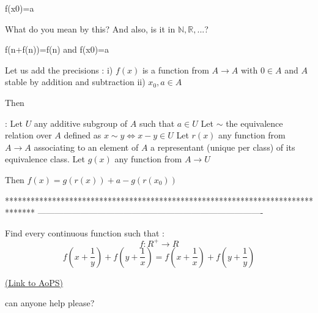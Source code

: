 \begin{solution}
	\begin{tcolorbox}f(x0)=a\end{tcolorbox}
What do you mean by this?
And also, is it in \(\mathbb{N}, \mathbb{R}, ...\)?
\end{solution}



\begin{solution}
	\begin{tcolorbox}f(n+f(n))=f(n) and f(x0)=a\end{tcolorbox}
Let us add the precisions :
i) $f(x)$ is a function from $A\to A$ with $0\in A$ and $A$ stable by addition and subtraction
ii) $x_0,a\in A$

Then  :
Let $U$ any additive subgroup of $A$ such that $a\in U$
Let $\sim$ the equivalence relation over $A$ defined as $x\sim y\iff x-y\in U$
Let $r(x)$ any function from $A\to A$ associating to an element of $A$ a representant (unique per class) of its equivalence class.
Let $g(x)$ any function from $A\to U$

Then $f(x)=g(r(x))+a-g(r(x_0))$
\end{solution}
*******************************************************************************
-------------------------------------------------------------------------------

\begin{problem}
	Find every continuous function such that :
\[f :R^{+}\rightarrow R\]
\[f(x+\frac{1}{y})+f(y+\frac{1}{x})=f(x+\frac{1}{x})+f(y+\frac{1}{y})\]
 
	\flushright \href{https://artofproblemsolving.com/community/c6h1605378}{(Link to AoPS)}
\end{problem}



\begin{solution}
	can anyone help please?

\end{solution}



